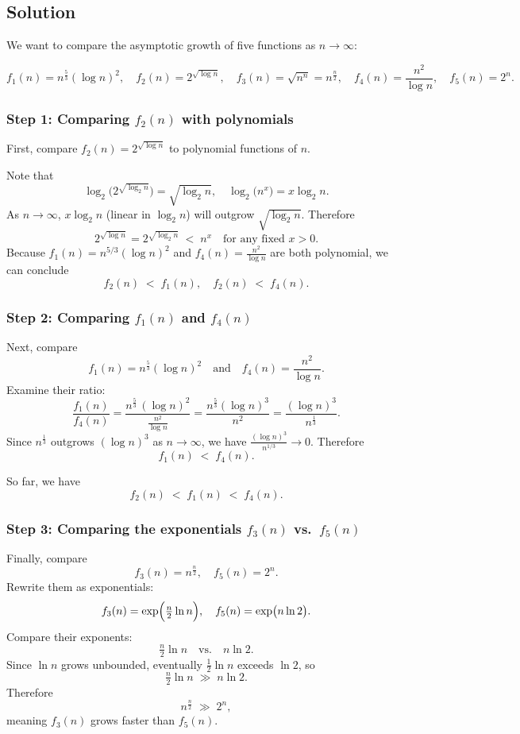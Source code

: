 \documentclass[12pt]{article}
\begin{document}
\subsection*{Solution}

We want to compare the asymptotic growth of five functions as \(n \to \infty\):

\[
f_1(n) = n^{\tfrac{5}{3}} (\log n)^2, 
\quad
f_2(n) = 2^{\sqrt{\log n}}, 
\quad
f_3(n) = \sqrt{n^n} = n^{\tfrac{n}{2}}, 
\quad
f_4(n) = \frac{n^2}{\log n},
\quad
f_5(n) = 2^n.
\]

\subsubsection*{Step 1: Comparing \(f_2(n)\) with polynomials}
First, compare \(f_2(n) = 2^{\sqrt{\log n}}\) to polynomial functions of \(n\). 

Note that 
\[
\log_2 \bigl( 2^{\sqrt{\log_2 n}} \bigr) 
= \sqrt{\log_2 n},
\quad
\log_2 \bigl(n^x \bigr)
= x \log_2 n.
\]
As \(n \to \infty\), \(x \log_2 n\) (linear in \(\log_2 n\)) will outgrow \(\sqrt{\log_2 n}\). Therefore
\[
2^{\sqrt{\log n}} = 2^{\sqrt{\log_2 n}} 
\; < \; 
n^x
\quad
\text{for any fixed } x > 0.
\]
Because \(f_1(n) = n^{5/3} (\log n)^2\) and \(f_4(n) = \tfrac{n^2}{\log n}\) are both polynomial, we can conclude
\[
f_2(n) \; < \; f_1(n), 
\quad
f_2(n) \; < \; f_4(n).
\]

\subsubsection*{Step 2: Comparing \(f_1(n)\) and \(f_4(n)\)}
Next, compare
\[
f_1(n) = n^{\tfrac{5}{3}} (\log n)^2
\quad\text{and}\quad
f_4(n) = \frac{n^2}{\log n}.
\]
Examine their ratio:
\[
\frac{f_1(n)}{f_4(n)}
= \frac{n^{\tfrac{5}{3}} \,(\log n)^2}{\tfrac{n^2}{\log n}}
= \frac{n^{\tfrac{5}{3}} (\log n)^3}{n^2}
= \frac{(\log n)^3}{n^{\tfrac{1}{3}}}.
\]
Since \(n^{\tfrac{1}{3}}\) outgrows \((\log n)^3\) as \(n\to\infty\), we have 
\(\tfrac{(\log n)^3}{n^{1/3}} \to 0\). Therefore
\[
f_1(n) \; < \; f_4(n).
\]

So far, we have
\[
f_2(n) \; < \; f_1(n) \; < \; f_4(n).
\]

\subsubsection*{Step 3: Comparing the exponentials \(f_3(n)\) vs.\ \(f_5(n)\)}
Finally, compare
\[
f_3(n) = n^{\tfrac{n}{2}},
\quad 
f_5(n) = 2^n.
\]
Rewrite them as exponentials:
\[
f_3(n) = \exp\Bigl(\tfrac{n}{2} \ln n\Bigr),
\quad
f_5(n) = \exp\bigl(n \ln 2\bigr).
\]
Compare their exponents:
\[
\tfrac{n}{2} \ln n
\quad \text{vs.} \quad
n \ln 2.
\]
Since \(\ln n\) grows unbounded, eventually \(\tfrac{1}{2}\ln n\) exceeds \(\ln 2\), so
\[
\tfrac{n}{2} \ln n 
\;\gg\;
n \ln 2.
\]
Therefore 
\[
n^{\tfrac{n}{2}} 
\;\gg\;
2^n,
\]
meaning \(f_3(n)\) grows faster than \(f_5(n)\).
\end{document}
